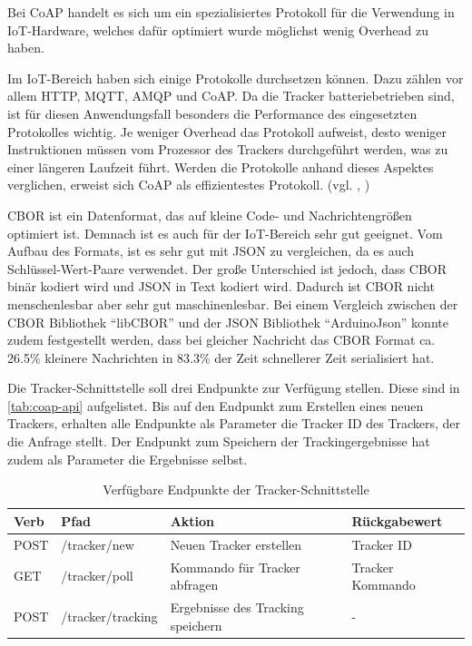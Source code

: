 Bei \gls{CoAP} handelt es sich um ein spezialisiertes Protokoll für die Verwendung in
\gls{IoT}-Hardware, welches dafür optimiert wurde möglichst wenig \gls{Overhead} zu haben.

Im \gls{IoT}-Bereich haben sich einige Protokolle durchsetzen können. Dazu zählen vor allem
\gls{HTTP}, \gls{MQTT}, \gls{AMQP} und \gls{CoAP}.
Da die Tracker batteriebetrieben sind, ist für diesen Anwendungsfall besonders die Performance des
eingesetzten Protokolles wichtig. Je weniger Overhead das Protokoll aufweist, desto weniger
Instruktionen müssen vom Prozessor des Trackers durchgeführt werden, was zu einer längeren Laufzeit
führt.
Werden die Protokolle anhand dieses Aspektes verglichen, erweist sich \gls{CoAP} als effizientestes
Protokoll. (vgl. \cite{Dizdarevic2019}, \cite{Naik2017})

\gls{CBOR} ist ein Datenformat, das auf kleine Code- und Nachrichtengrößen optimiert ist.
Demnach ist es auch für der \gls{IoT}-Bereich sehr gut geeignet.
Vom Aufbau des Formats, ist es sehr gut mit \gls{JSON} zu vergleichen, da es auch Schlüssel-Wert-Paare verwendet.
Der große Unterschied ist jedoch, dass \gls{CBOR} binär kodiert wird und \gls{JSON} in Text kodiert wird.
Dadurch ist \gls{CBOR} nicht menschenlesbar aber sehr gut maschinenlesbar.
Bei einem Vergleich zwischen der \gls{CBOR} Bibliothek \enquote{libCBOR} und der \gls{JSON} Bibliothek \enquote{ArduinoJson}
konnte zudem festgestellt werden, dass bei gleicher Nachricht das \gls{CBOR} Format ca. 26.5\% kleinere Nachrichten
in 83.3\% der Zeit schnellerer Zeit serialisiert hat.

Die Tracker-Schnittstelle soll drei Endpunkte zur Verfügung stellen.
Diese sind in \autoref{tab:coap-api} aufgelistet.
Bis auf den Endpunkt zum Erstellen eines neuen Trackers, erhalten alle Endpunkte als Parameter die Tracker ID des Trackers, der die Anfrage stellt.
Der Endpunkt zum Speichern der Trackingergebnisse hat zudem als Parameter die Ergebnisse selbst.

\begin{table}[]
\begin{tabular}{l l l l}
\textbf{Verb} & \textbf{Pfad}     & \textbf{Aktion}                   & \textbf{Rückgabewert}    \\ \hline
POST          & /tracker/new      & Neuen Tracker erstellen           & Tracker ID \\ \hline
GET           & /tracker/poll     & Kommando für Tracker abfragen     & Tracker Kommando   \\ \hline
POST          & /tracker/tracking & Ergebnisse des Tracking speichern & -
\end{tabular}
\caption{\label{tab:coap-api}Verfügbare Endpunkte der Tracker-Schnittstelle}
\end{table}

